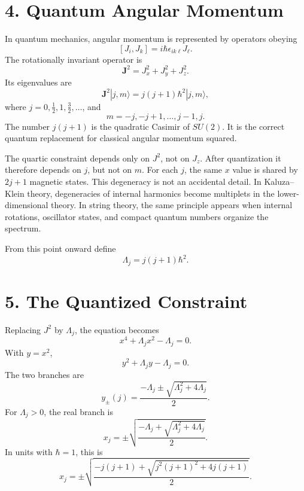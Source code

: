 \documentclass[11pt]{article}
\newcommand{\Lspin}{\Lambda_j}
\newcommand{\hb}{\hbar}
\begin{document}
\section*{4. Quantum Angular Momentum}

In quantum mechanics, angular momentum is represented by operators obeying
\[
        [J_i,J_k]=i\hb\epsilon_{ik\ell}J_{\ell}.
\]
The rotationally invariant operator is
\[
        \mathbf{J}^2=J_x^2+J_y^2+J_z^2 .
\]
Its eigenvalues are
\begin{equation}
        \mathbf{J}^2 |j,m\rangle=j(j+1)\hb^2 |j,m\rangle ,
        \label{eq:casimir}
\end{equation}
where \(j=0,\frac12,1,\frac32,\ldots\), and
\[
        m=-j,-j+1,\ldots,j-1,j .
\]
The number \(j(j+1)\) is the quadratic Casimir of \(SU(2)\). It is the correct quantum replacement for classical angular momentum squared.

The quartic constraint depends only on \(J^2\), not on \(J_z\). After quantization it therefore depends on \(j\), but not on \(m\). For each \(j\), the same \(x\) value is shared by \(2j+1\) magnetic states. This degeneracy is not an accidental detail. In Kaluza--Klein theory, degeneracies of internal harmonics become multiplets in the lower-dimensional theory. In string theory, the same principle appears when internal rotations, oscillator states, and compact quantum numbers organize the spectrum.

From this point onward define
\begin{equation}
        \Lspin=j(j+1)\hb^2 .
\end{equation}


\section*{5. The Quantized Constraint}

Replacing \(J^2\) by \(\Lspin\), the equation becomes
\begin{equation}
        x^4+\Lspin x^2-\Lspin=0 .
        \label{eq:quantized}
\end{equation}
With \(y=x^2\),
\begin{equation}
        y^2+\Lspin y-\Lspin=0 .
\end{equation}
The two branches are
\begin{equation}
        y_{\pm}(j)=
        \frac{-\Lspin\pm\sqrt{\Lspin^2+4\Lspin}}{2}.
        \label{eq:yquant}
\end{equation}
For \(\Lspin>0\), the real branch is
\begin{equation}
        x_j=\pm
        \sqrt{\frac{-\Lspin+\sqrt{\Lspin^2+4\Lspin}}{2}} .
        \label{eq:xquant}
\end{equation}
In units with \(\hb=1\), this is
\begin{equation}
        x_j=\pm
        \sqrt{
        \frac{-j(j+1)+\sqrt{j^2(j+1)^2+4j(j+1)}}{2}
        } .
\end{equation}
\end{document}
